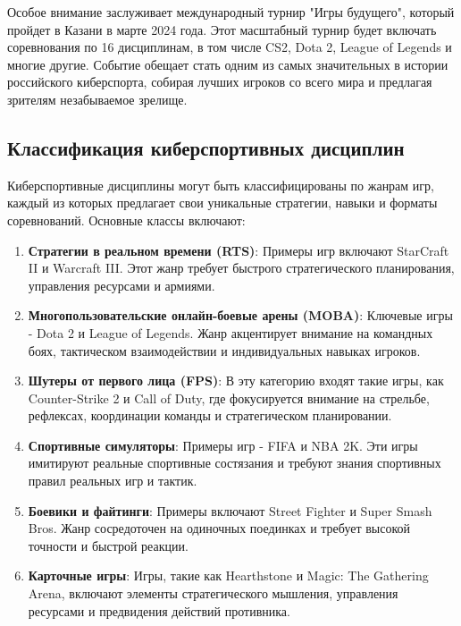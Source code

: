 Особое внимание заслуживает международный турнир "Игры будущего", который пройдет в Казани в марте 2024 года. Этот масштабный турнир будет включать соревнования по 16 дисциплинам, в том числе CS2, Dota 2, League of Legends и многие другие. Событие обещает стать одним из самых значительных в истории российского киберспорта, собирая лучших игроков со всего мира и предлагая зрителям незабываемое зрелище.
\subsection{Классификация киберспортивных дисциплин}

Киберспортивные дисциплины могут быть классифицированы по жанрам игр, каждый из которых предлагает свои уникальные стратегии, навыки и форматы соревнований. Основные классы включают:

\begin{enumerate}
	\item \textbf{Стратегии в реальном времени (RTS)}: 
	Примеры игр включают StarCraft II и Warcraft III. Этот жанр требует быстрого стратегического планирования, управления ресурсами и армиями.
	
	\item \textbf{Многопользовательские онлайн-боевые арены (MOBA)}: 
	Ключевые игры - Dota 2 и League of Legends. Жанр акцентирует внимание на командных боях, тактическом взаимодействии и индивидуальных навыках игроков.
	
	\item \textbf{Шутеры от первого лица (FPS)}: 
	В эту категорию входят такие игры, как Counter-Strike 2 и Call of Duty, где фокусируется внимание на стрельбе, рефлексах, координации команды и стратегическом планировании.
	
	\item \textbf{Спортивные симуляторы}: 
	Примеры игр - FIFA и NBA 2K. Эти игры имитируют реальные спортивные состязания и требуют знания спортивных правил реальных игр и тактик.
	
	\item \textbf{Боевики и файтинги}: 
	Примеры включают Street Fighter и Super Smash Bros. Жанр сосредоточен на одиночных поединках и требует высокой точности и быстрой реакции.
	
	\item \textbf{Карточные игры}: 
	Игры, такие как Hearthstone и Magic: The Gathering Arena, включают элементы стратегического мышления, управления ресурсами и предвидения действий противника.
\end{enumerate}
